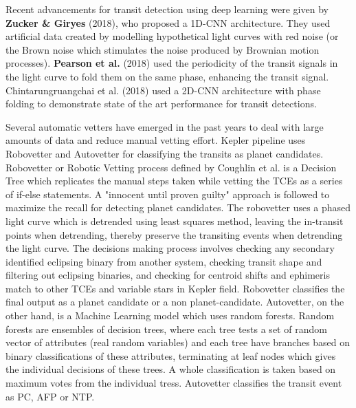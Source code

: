 Recent advancements for transit detection using deep learning were given by \textbf{Zucker & Giryes} (2018), who proposed a 1D-CNN architecture. They used artificial data created by modelling hypothetical light curves with red noise (or the Brown noise which stimulates the noise produced by Brownian motion processes). \textbf{Pearson
et al.} (2018) used the periodicity of the transit signals in the light curve to fold them on the same phase, enhancing the transit signal. Chintarungruangchai et al. (2018) used a 2D-CNN architecture with phase folding to demonstrate state of the art performance for transit detections.

Several automatic vetters have emerged in the past years to deal with large amounts of data and reduce manual vetting effort. Kepler pipeline uses Robovetter and Autovetter for classifying the transits as planet candidates. Robovetter or Robotic Vetting process defined by Coughlin et al. is a Decision Tree which replicates the manual steps taken while vetting the TCEs as a series of if-else statements. A "innocent until proven guilty" approach is followed to maximize the recall for detecting planet candidates. The robovetter uses a phased light curve which is detrended using least squares method, leaving the in-transit points when detrending, thereby preserve the transiting events when detrending the light curve. The decisions making process involves checking any secondary identified eclipsing binary from another system, checking transit shape and filtering out eclipsing binaries, and checking for centroid shifts and ephimeris match to other TCEs and variable stars in Kepler field. Robovetter classifies the final output as a planet candidate or a non planet-candidate. Autovetter, on the other hand, is a Machine Learning model which uses random forests. Random forests are ensembles of decision trees, where each tree tests a set of random vector of attributes (real random variables) and each tree have branches based on binary classifications of these attributes, terminating at leaf nodes which gives the individual decisions of these trees. A whole classification is taken based on maximum votes from the individual tress. Autovetter classifies the transit event as PC, AFP or NTP.

